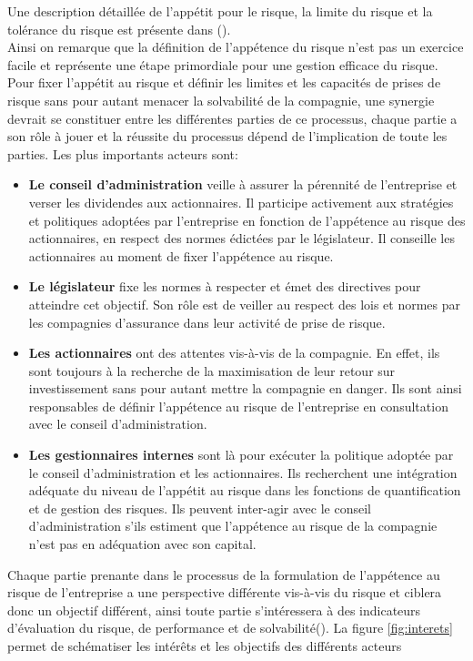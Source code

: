 \documentclass[11pt]{article}
\begin{document}
Une description détaillée de l'appétit pour le risque, la limite du risque et la tolérance du risque est présente dans (\cite{riskappetite}).\\
Ainsi on remarque que la définition de l'appétence du risque n'est pas un exercice facile et représente une étape primordiale pour une gestion efficace du risque.\\
Pour fixer l'appétit au risque et définir les limites et les capacités de prises de risque sans pour autant menacer la solvabilité de la compagnie, une synergie devrait se constituer entre les différentes parties de ce processus, chaque partie a son rôle à jouer et la réussite du processus dépend de l'implication de toute les parties. Les plus importants acteurs sont:
\begin{itemize}
\item \textbf{Le conseil d'administration} veille à assurer la pérennité de l'entreprise et verser les dividendes aux actionnaires. Il participe activement aux stratégies et politiques adoptées par l'entreprise en fonction de l'appétence au risque des actionnaires, en respect des normes édictées par le législateur. Il conseille les actionnaires au moment de fixer l'appétence au risque.
\item \textbf{Le législateur} fixe les normes à respecter et émet des directives pour atteindre cet objectif. Son rôle est de veiller au respect des lois et normes par les compagnies d'assurance dans leur activité de prise de risque. \\
\item \textbf{Les actionnaires} ont des attentes vis-à-vis de la compagnie. En effet, ils sont toujours à la recherche de la maximisation de leur retour sur investissement  sans pour autant mettre la compagnie en danger. Ils sont ainsi responsables de définir l'appétence au risque de l'entreprise en consultation avec le conseil d'administration.
\item \textbf{Les gestionnaires internes} sont là pour exécuter la politique adoptée par le conseil d'administration et les actionnaires. Ils recherchent une intégration adéquate du niveau de l'appétit au risque dans les fonctions de quantification et de gestion des risques. Ils peuvent inter-agir avec le conseil d'administration s'ils estiment que l'appétence au risque de la compagnie n'est pas en adéquation avec son capital.
\end{itemize}

Chaque partie prenante dans le processus de la formulation de l'appétence au risque de l'entreprise a une perspective différente vis-à-vis du risque et ciblera donc un objectif différent, ainsi toute partie s'intéressera à des indicateurs d'évaluation du risque, de performance et de solvabilité(\cite{link}).  La figure \ref{fig:interets} permet de schématiser les intérêts et les objectifs des différents acteurs
\end{document}
